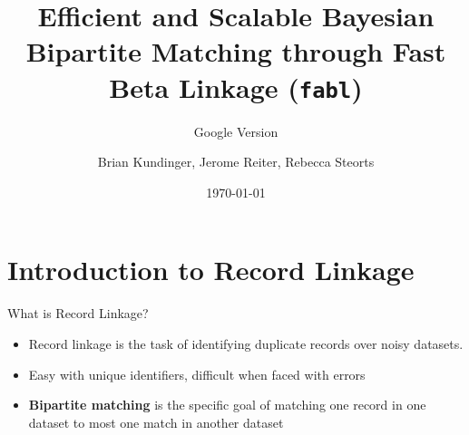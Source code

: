 \documentclass{beamer}
\begin{document}
	\title{Efficient and Scalable Bayesian Bipartite Matching through Fast Beta Linkage (\texttt{fabl})}
	\subtitle{Google Version}
	\author{Brian Kundinger, Jerome Reiter, Rebecca Steorts}
	\date{\today}
	

	
	\begin{frame}
		\titlepage
	\end{frame}


\section{Introduction to Record Linkage}

	\begin{frame}{What is Record Linkage?}
	\begin{itemize}
		\item Record linkage is the task of identifying duplicate records over noisy datasets.
		
		\item Easy with unique identifiers, difficult when faced with errors
		
		\item \textbf{Bipartite matching} is the specific goal of matching one record in one dataset to most one match in another dataset
	\end{itemize}
	\end{frame}


%			
\end{document}
